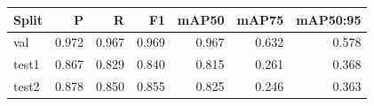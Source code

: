 \begin{tabular}{lrrrrrr}
\toprule
Split & P & R & F1 & mAP50 & mAP75 & mAP50:95 \\
\midrule
val & 0.972 & 0.967 & 0.969 & 0.967 & 0.632 & 0.578 \\
test1 & 0.867 & 0.829 & 0.840 & 0.815 & 0.261 & 0.368 \\
test2 & 0.878 & 0.850 & 0.855 & 0.825 & 0.246 & 0.363 \\
\bottomrule
\end{tabular}
